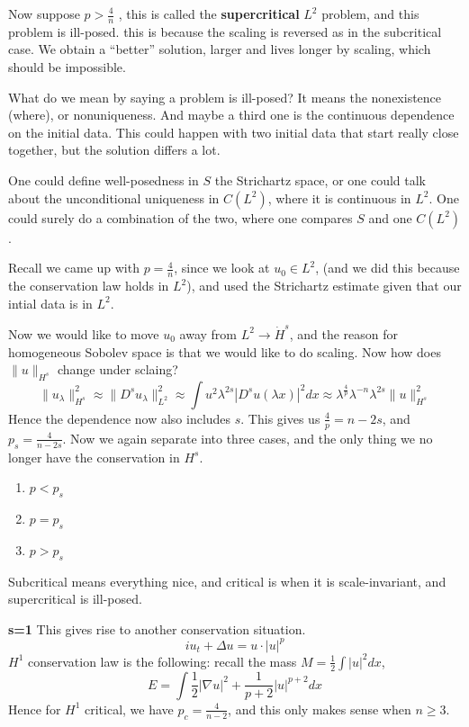 Now suppose $p>\frac{4}{n}$ , this is called the \textbf{supercritical} $L^2$ problem, and this problem is ill-posed. this is because the scaling is reversed as in the subcritical case. We obtain a ``better'' solution, larger and lives longer by scaling, which should be impossible.

\begin{note}
    What do we mean by saying a problem is ill-posed? It means the nonexistence (where), or nonuniqueness. And maybe a third one is the continuous dependence on the initial data. This could happen with two initial data that start really close together, but the solution differs a lot.
\end{note}

One could define well-posedness in $S$ the Strichartz space, or one could talk about the unconditional uniqueness in $C(L^2)$, where it is continuous in $L^2$. One could surely do a combination of the two, where one compares $S$ and one $C(L^2)$.

Recall we came up with $p=\frac{4}{n}$, since we look at $u_0\in L^2$, (and we did this because the conservation law holds in $L^2$), and used the Strichartz estimate given that our intial data is in $L^2$.

Now we would like to move $u_0$ away from $L^2\to \dot{H}^s$, and the reason for homogeneous Sobolev space is that we would like to do scaling. Now how does $\|u\|_{H^s}$ change under sclaing?
\begin{equation*}
    \|u_\lambda\|_{H^s}^2\approx \|D^su_\lambda\|_{L^2}^2\approx \int u^2\lambda^{2s}|D^su(\lambda x)|^2dx\approx \lambda^{\frac{4}{p}}\lambda^{-n}\lambda^{2s}\|u\|_{H^s}^2
\end{equation*}
Hence the dependence now also includes $s$. This gives us $\frac{4}{p}=n-2s$, and $p_s=\frac{4}{n-2s}$. Now we again separate into three cases, and the only thing we no longer have the conservation in $H^s$.
\begin{enumerate}
    \item $p<p_s$
    \item $p=p_s$
    \item $p>p_s$
\end{enumerate}
\begin{remark}
    Subcritical means everything nice, and critical is when it is scale-invariant, and supercritical is ill-posed.
\end{remark}

\textbf{s=1} This gives rise to another conservation situation.
\begin{equation*}
    iu_t+\Delta u=u\cdot|u|^p
\end{equation*}
$H^1$ conservation law is the following: recall the mass $M=\frac{1}{2}\int |u|^2dx$,
\begin{equation*}
    E=\int\frac{1}{2}|\nabla u|^2+\frac{1}{p+2}|u|^{p+2}dx
\end{equation*}
Hence for $H^1$ critical, we have $p_c=\frac{4}{n-2}$, and this only makes sense when $n\geq 3$.

